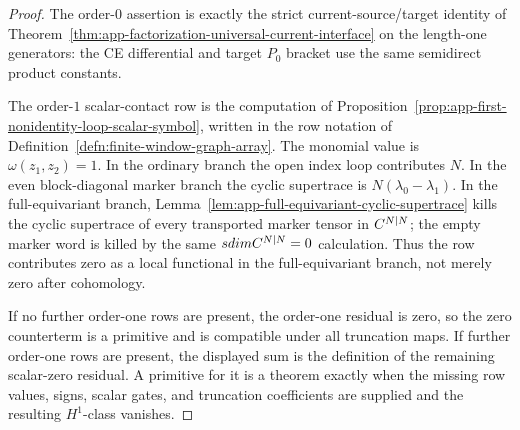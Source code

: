 \begin{proof}
  The order-\(0\) assertion is exactly the strict current-source/target
  identity of Theorem~\ref{thm:app-factorization-universal-current-interface}
  on the length-one generators: the CE differential and target \(P_0\)
  bracket use the same semidirect product constants.

  The order-\(1\) scalar-contact row is the computation of
  Proposition~\ref{prop:app-first-nonidentity-loop-scalar-symbol}, written in
  the row notation of Definition~\ref{defn:finite-window-graph-array}.  The
  monomial value is \(\omega(z_1,z_2)=1\).  In the ordinary branch the open
  index loop contributes \(N\).  In the even block-diagonal marker branch
  the cyclic supertrace is \(N(\lambda_0-\lambda_1)\).  In the
  full-equivariant branch, Lemma~\ref{lem:app-full-equivariant-cyclic-supertrace}
  kills the cyclic supertrace of every transported marker tensor in
  \(C^{N|N}\); the empty marker word is killed by the same
  \(sdimC^{N|N}=0\) calculation.  Thus the row contributes
  zero as a local functional in the full-equivariant branch, not merely zero
  after cohomology.

  If no further order-one rows are present, the order-one residual is zero,
  so the zero counterterm is a primitive and is compatible under all
  truncation maps.  If further order-one rows are present, the displayed sum
  is the definition of the remaining scalar-zero residual.  A primitive for
  it is a theorem exactly when the missing row values, signs, scalar gates,
  and truncation coefficients are supplied and the resulting \(H^1\)-class
  vanishes.
\end{proof}

